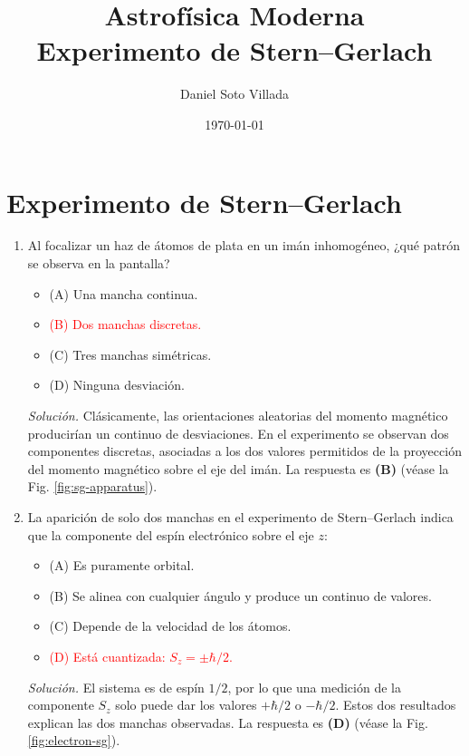 \documentclass[11pt]{article}
\title{Astrofísica Moderna\\[0.4em]
\large Experimento de Stern--Gerlach}
\author{Daniel Soto Villada}
\date{\today}
\begin{document}
\maketitle

\section{Experimento de Stern--Gerlach}


\begin{enumerate}
    \item Al focalizar un haz de átomos de plata en un imán inhomogéneo, ¿qué patrón se observa en la pantalla?
    \begin{itemize}
        \item (A) Una mancha continua.
        \item \textcolor{red}{(B) Dos manchas discretas.}
        \item (C) Tres manchas simétricas.
        \item (D) Ninguna desviación.
    \end{itemize}
    \textit{Solución.} Clásicamente, las orientaciones aleatorias del momento magnético producirían un continuo de desviaciones. En el experimento se observan dos componentes discretas, asociadas a los dos valores permitidos de la proyección del momento magnético sobre el eje del imán. La respuesta es \textbf{(B)} (véase la Fig. \ref{fig:sg-apparatus}). \parencite[Sec. 18.2, pp. 581--582]{chaparro2026}

    \item La aparición de solo dos manchas en el experimento de Stern--Gerlach indica que la componente del espín electrónico sobre el eje $z$:
    \begin{itemize}
        \item (A) Es puramente orbital.
        \item (B) Se alinea con cualquier ángulo y produce un continuo de valores.
        \item (C) Depende de la velocidad de los átomos.
        \item \textcolor{red}{(D) Está cuantizada: $S_z=\pm\hbar/2$.}
    \end{itemize}
    \textit{Solución.} El sistema es de espín $1/2$, por lo que una medición de la componente $S_z$ solo puede dar los valores $+\hbar/2$ o $-\hbar/2$. Estos dos resultados explican las dos manchas observadas. La respuesta es \textbf{(D)} (véase la Fig. \ref{fig:electron-sg}). \parencite[Sec. 18.2, pp. 582--583]{chaparro2026}


\end{enumerate}
\end{document}
